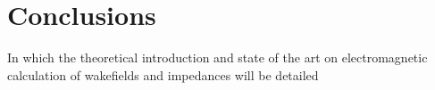 %
\chapter{Conclusions}
\label{ch::chapter6}

\begin{center}
  \begin{minipage}{0.5\textwidth}
    \begin{small}
      In which the theoretical introduction and state of the art on electromagnetic calculation of wakefields and impedances will be detailed
    \end{small}
  \end{minipage}
  \vspace{0.5cm}
\end{center}

